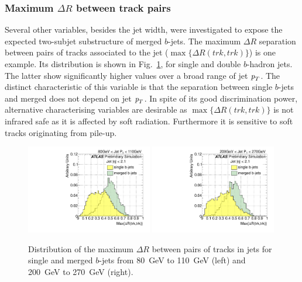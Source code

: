 \subsubsection{Maximum $\Delta R$ between track pairs}  

Several other variables, besides the jet width, were investigated to expose the expected two-subjet substructure of merged $b$-jets.  The maximum $\Delta R$ separation between pairs of tracks associated to the jet ($\max\{\Delta R(trk,trk)\}$) is one example. %
Its distribution is shown in Fig.~\ref{fig:drmaxsinglemerged}, for single and double $b$-hadron jets. The latter show significantly higher values over a broad range of jet ${\emph{p}_{T}}$. The distinct characteristic of this variable is that the separation between single $b$-jets and merged does not depend on jet ${\emph{p}_{T}}$. In spite of its good discrimination power, alternative characterising variables are desirable as $\max\{\Delta R(trk,trk)\}$ is not infrared safe as it is affected by soft radiation. Furthermore it is  sensitive to soft tracks originating from pile-up. 

\begin{figure}[tp]
\centering
\includegraphics[width=0.49\textwidth]{FIGS/VarsSingleMerged/drmax080.pdf}
\includegraphics[width=0.49\textwidth]{FIGS/VarsSingleMerged/drmax200.pdf}
\caption{Distribution of the maximum $\Delta R$ between pairs of tracks in jets for single and merged $b$-jets from 80~GeV to 110~GeV (left) and 200~GeV to 270~GeV (right).}
\label{fig:drmaxsinglemerged}
\end{figure}


